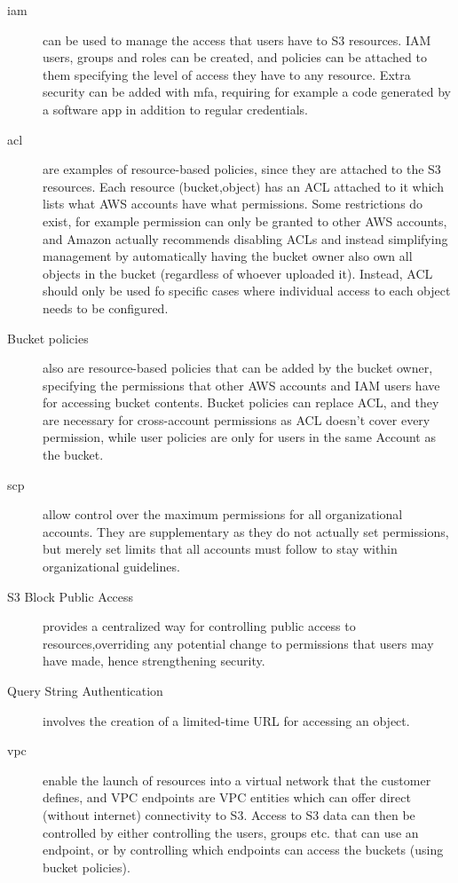 \begin{description}
    \item[\ac{iam}] can be used to manage the access that users have to S3 resources. IAM users, groups and roles can be created, and policies can be attached to them specifying the level of access they have to any resource. Extra security can be added with \ac{mfa}, requiring for example a code generated by a software app in addition to regular credentials.

    \item[\ac{acl}] are examples of resource-based policies, since they are attached to the S3 resources. Each resource (bucket,object) has an ACL attached to it which lists what AWS accounts have what permissions. Some restrictions do exist, for example permission can only be granted to other AWS accounts, and Amazon actually recommends disabling ACLs and instead simplifying management by automatically having the bucket owner also own all objects in the bucket (regardless of whoever uploaded it). Instead, ACL should only be used fo specific cases where individual access to each object needs to be configured.

    \item[Bucket policies] also are resource-based policies that can be added by the bucket owner, specifying the permissions that other AWS accounts and IAM users have for accessing bucket contents. Bucket policies can replace ACL, and they are necessary for cross-account permissions as ACL doesn't cover every permission, while user policies are only for users in the same Account as the bucket.

    \item[\ac{scp}] allow control over the maximum permissions for all organizational accounts. They are supplementary as they do not actually set permissions, but merely set limits that all accounts must follow to stay within organizational guidelines.

    \item[S3 Block Public Access] provides a centralized way for controlling public access to resources,overriding any potential change to permissions that users may have made, hence strengthening security.

    \item[Query String Authentication] involves the creation of a limited-time URL for accessing an object.

    \item [\ac{vpc}] enable the launch of resources into a virtual network that the customer defines, and VPC endpoints are VPC entities which can offer direct (without internet) connectivity to S3. Access to S3 data can then be controlled by either controlling the users, groups etc. that can use an endpoint, or by controlling which endpoints can access the buckets (using bucket policies).
\end{description}

